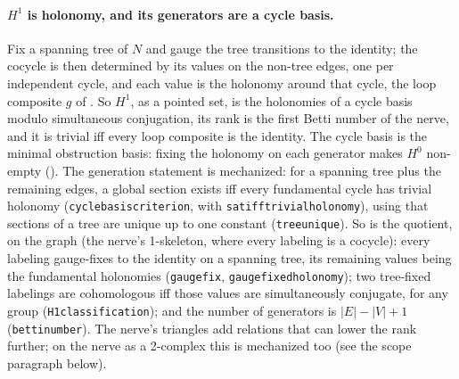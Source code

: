 \documentclass[11pt,a4paper]{article}
\theoremstyle{plain}
\theoremstyle{definition}
\theoremstyle{remark}
\newcommand{\Hz}{H^0}
\newcommand{\Ho}{H^1}
\renewcommand{\_}{\origunderscore\allowbreak}
\begin{document}
\paragraph{$\Ho$ is holonomy, and its generators are a cycle basis.} Fix a spanning tree of $N$ and
gauge the tree transitions to the identity; the cocycle is then determined by its values on the
non-tree edges, one per independent cycle, and each value is the holonomy around that cycle, the loop
composite $g$ of . So $\Ho$, as a pointed set, is the holonomies of a cycle
basis modulo simultaneous conjugation, its rank is the first Betti number of the nerve, and it is
trivial iff every loop composite is the identity. The cycle basis is the minimal obstruction basis:
fixing the holonomy on each generator makes $\Hz$ non-empty (). The generation
statement is mechanized: for a spanning tree plus the remaining edges, a global section exists iff
every fundamental cycle has trivial holonomy (\texttt{cycle\_basis\_criterion}, with
\texttt{sat\_iff\_trivial\_holonomy}), using that sections of a tree are unique up to one constant
(\texttt{tree\_unique}). So is the quotient, on the graph (the nerve's 1-skeleton, where every
labeling is a cocycle): every labeling gauge-fixes to the identity on a spanning tree, its remaining
values being the fundamental holonomies (\texttt{gauge\_fix}, \texttt{gauge\_fixed\_holonomy}); two
tree-fixed labelings are cohomologous iff those values are simultaneously conjugate, for any group
(\texttt{H1\_classification}); and the number of generators is $|E| - |V| + 1$
(\texttt{betti\_number}). The nerve's triangles add relations that can lower the rank further; on the
nerve as a 2-complex this is mechanized too (see the scope paragraph below).
\end{document}
